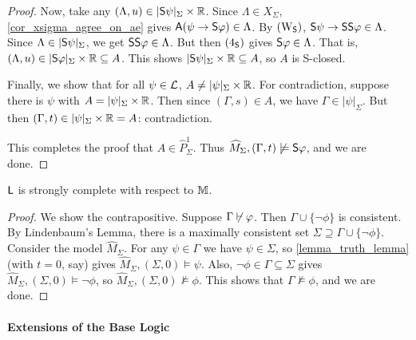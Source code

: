 \begin{proof}
    Now, take any $(\Lambda, u) \in |\S\psi|_\Sigma \times \R$.
    Since $\Lambda \in X_\Sigma$, \cref{cor_xsigma_agree_on_ae} gives
    $\A(\psi \limplies \S\phi) \in \Lambda$. By $\weakeningS$,
    $\S\psi \limplies \S\S\phi \in \Lambda$. Since $\Lambda \in
    |\S\psi|_\Sigma$, we get $\S\S\phi \in \Lambda$. But then
    $\foursoundness$ gives $\S\phi \in \Lambda$. That is, $(\Lambda,
    u) \in |\S\phi|_\Sigma \times \R \subseteq A$. This shows
    $|\S\psi|_\Sigma \times \R \subseteq A$, so $A$ is
    S-closed.

    Finally, we show that for all $\psi \in \cL$, $A \ne
    |\psi|_\Sigma \times \R$.  For contradiction, suppose there is
    $\psi$ with $A = |\psi|_\Sigma \times \R$. Then since $(\Gamma,
    s) \in A$, we have $\Gamma \in |\psi|_\Sigma$. But then $(\Gamma,
    t) \in |\psi|_\Sigma \times \R = A$: contradiction.

    This completes the proof that $A \in \widehat{P}_\Sigma^1$.  Thus
    $\widehat{M}_\Sigma, (\Gamma, t) \not\models \S\phi$, and we are done.

\end{proof}

\begin{theorem}
\label{thm_strong_completeness}
    $\sL$ is strongly complete\footnotemark{} with respect to $\M$.
\end{theorem}


\begin{proof}
We show the contrapositive. Suppose $\Gamma \not\entails \phi$.
Then $\Gamma \cup \{\neg\phi\}$ is consistent. By Lindenbaum's
Lemma, there is a maximally consistent set $\Sigma \supseteq \Gamma
\cup \{\neg\phi\}$. Consider the model $\widehat{M}_\Sigma$. For
any $\psi \in \Gamma$ we have $\psi \in \Sigma$, so
\cref{lemma_truth_lemma} (with $t = 0$, say) gives
$\widehat{M}_\Sigma, (\Sigma, 0) \models \psi$. Also,
$\neg\phi \in \Gamma \subseteq \Sigma$ gives
$\widehat{M}_\Sigma, (\Sigma, 0) \models \neg\phi$, so
$\widehat{M}_\Sigma, (\Sigma, 0) \not\models \phi$. This shows that
$\Gamma \not\models \phi$, and we are done.
\end{proof}

\paragraph{Extensions of the Base Logic}

